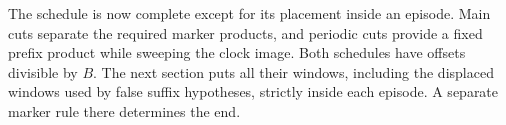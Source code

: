 The schedule is now complete except for its placement inside an episode.
Main cuts separate the required marker products, and periodic cuts provide
a fixed prefix product while sweeping the clock image. Both schedules
have offsets divisible by $B$. The next section puts all their windows,
including the displaced windows used by false suffix hypotheses, strictly
inside each episode. A separate marker rule there determines the end.
